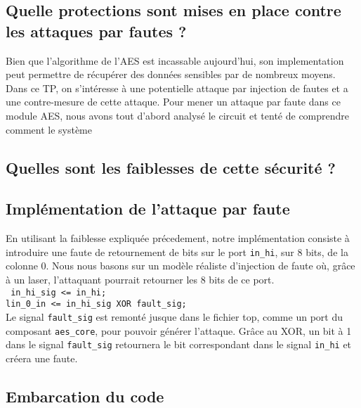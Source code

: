 \subsection{Quelle protections sont mises en place contre les attaques par fautes ?}

Bien que l'algorithme de l'AES est incassable aujourd'hui, son implementation peut permettre de récupérer des données sensibles par de nombreux moyens.
Dans ce TP, on s'intéresse à une potentielle attaque par injection de fautes et a une contre-mesure de cette attaque. 
Pour mener un attaque par faute  dans ce module AES, nous avons tout d'abord analysé le circuit et tenté de comprendre comment le système 

\subsection{Quelles sont les faiblesses de cette sécurité ?}

\subsection{Implémentation de l'attaque par faute}

En utilisant la faiblesse expliquée précedement, notre implémentation
consiste à introduire une faute de retournement de bits sur le port
\texttt{in_hi}, sur 8 bits, de la colonne 0. Nous nous basons sur un
modèle réaliste d'injection de faute où, grâce à un laser, l'attaquant
pourrait retourner les 8 bits de ce port.\\
\texttt{
  in_hi_sig <= in_hi; \\
  lin_0_in <= in_hi_sig XOR fault_sig;
} \\
Le signal \texttt{fault_sig} est remonté jusque dans le fichier top, comme un
port du composant \texttt{aes_core}, pour pouvoir générer l'attaque.
Grâce au XOR,
un bit à 1 dans le signal \texttt{fault_sig} retournera le bit correspondant
dans le signal \texttt{in_hi} et créera une faute.


\subsection{Embarcation du code}


